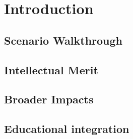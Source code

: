 \section{Introduction}


\subsection{Scenario Walkthrough}

\subsection{Intellectual Merit}


\subsection{Broader Impacts}


\subsection{Educational integration}



